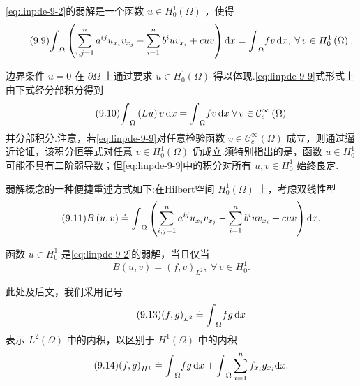\begin{definition}\label{def:linpde-9-2}
\eqref{eq:linpde-9-2}的弱解是一个函数 $u \in  {H}_{0}^{1}\left( \Omega \right)$ ，使得
\begin{equation}\tag{9.9}\label{eq:linpde-9-9}
{\int }_{\Omega }\left( {\sum_{{i,j = 1}}^{n}{a}^{ij}{u}_{{x}_{i}}{v}_{{x}_{j}} - \sum_{{i = 1}}^{n}{b}^{i}u{v}_{{x}_{i}} + {cuv}}\right) {\mathop{}\!\mathrm{d} x} = {\int }_{\Omega }{fv\mathop{}\!\mathrm{d} x},\;\forall\,v \in  {H}_{0}^{1}\left( \Omega \right) .
\end{equation}
\end{definition}

\begin{remark}\label{rem:linpde-9-3}
边界条件 $u = 0$ 在 $\partial \Omega$ 上通过要求 $u \in  {H}_{0}^{1}\left( \Omega \right)$ 得以体现.\eqref{eq:linpde-9-9}式形式上由下式经分部积分得到
\begin{equation}\tag{9.10}\label{eq:linpde-9-10}
{\int }_{\Omega }\left( {Lu}\right) {v\mathop{}\!\mathrm{d} x} = {\int }_{\Omega }{fv\mathop{}\!\mathrm{d} x}\;\forall\,v \in  {\mathcal{C}}_{c}^{\infty }\left( \Omega \right)
\end{equation}
并分部积分.注意，若\eqref{eq:linpde-9-9}对任意检验函数 $v \in  {\mathcal{C}}_{c}^{\infty }\left( \Omega \right)$ 成立，则通过逼近论证，该积分恒等式对任意 $v \in  {H}_{0}^{1}\left( \Omega \right)$ 仍成立.须特别指出的是，函数 $u \in  {H}_{0}^{1}$ 可能不具有二阶弱导数；但\eqref{eq:linpde-9-9}中的积分对所有 $u,v \in  {H}_{0}^{1}$ 始终良定.
\end{remark}

弱解概念的一种便捷重述方式如下:在Hilbert空间 ${H}_{0}^{1}\left( \Omega \right)$ 上，考虑双线性型
\begin{equation}\tag{9.11}\label{eq:linpde-9-11}
B\left(  {u,v}\right)   \doteq  {\int }_{\Omega }\left( {\sum_{{i,j = 1}}^{n}{a}^{ij}{u}_{{x}_{i}}{v}_{{x}_{j}} - \sum_{{i = 1}}^{n}{b}^{i}u{v}_{{x}_{i}} + {cuv}}\right) {\mathop{}\!\mathrm{d} x}.
\end{equation}

函数 $u \in  {H}_{0}^{1}$ 是\eqref{eq:linpde-9-2}的弱解，当且仅当
\begin{equation}\tag{9.12}\label{eq:linpde-9-12}
B\left(  {u,v}\right)   = {\left( f,v\right) }_{{L}^{2}},\;\forall\,v \in  {H}_{0}^{1}.
\end{equation}

此处及后文，我们采用记号
\begin{equation}\tag{9.13}\label{eq:linpde-9-13}
{\left( f,g\right) }_{{L}^{2}} \doteq  {\int }_{\Omega }{fg\mathop{}\!\mathrm{d} x}
\end{equation}
表示 ${L}^{2}\left( \Omega \right)$ 中的内积，以区别于 ${H}^{1}\left( \Omega \right)$ 中的内积
\begin{equation}\tag{9.14}\label{eq:linpde-9-14}
{\left( f,g\right) }_{{H}^{1}} \doteq  {\int }_{\Omega }{fg\mathop{}\!\mathrm{d} x} + {\int }_{\Omega }\sum_{{i = 1}}^{n}{f}_{{x}_{i}}{g}_{{x}_{i}}{\mathop{}\!\mathrm{d} x}.
\end{equation}


